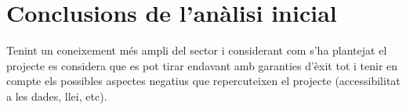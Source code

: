 \section{Conclusions de l'anàlisi inicial}

Tenint un coneixement més ampli del sector i considerant com s’ha plantejat
el projecte es considera que es pot tirar endavant amb garanties d’èxit tot i
tenir en compte els possibles aspectes negatius que repercuteixen el projecte
(accessibilitat a les dades, llei, etc).

